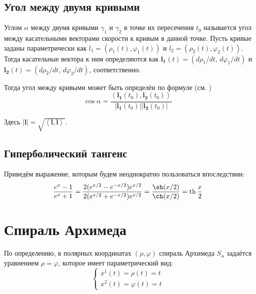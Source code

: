 \documentclass{article}
\numberwithin{equation}{section}
\renewcommand{\phi}{\varphi}
\newcommand{\scalmult}[2]{{\left \langle #1 \right \rangle}_{#2}}
\renewcommand{\vec}{\mathbf}
\renewcommand{\th}{\operatorname{th}}
\providecommand{\abs}[1]{\left \lvert{#1}\right \rvert}
\begin{document}
\subsection{Угол между двумя кривыми}

Углом $\alpha$ между двумя кривыми $\gamma_1$ и $\gamma_2$ в точке их
пересечения $t_0$ называется угол между касательными векторами
скорости к кривым в данной точке. Пусть кривые заданы параметрически
как $l_1 = (\rho_1(t), \phi_1(t))$ и $l_2 = (\rho_2(t), \phi_2(t))$.
Тогда касательные вектора к ним определяются как $\vec{l_1}(t) =
(d\rho_1/dt,\,d\phi_1/dt)$ и $\vec{l_2}(t) =
(d\rho_2/dt,\,d{\phi_2}/dt)$, соответственно.

Тогда угол между
кривыми может быть определён по формуле (см. \cite{dubrovin98})
\begin{equation}\label{eq:curves-angle}
  \cos \alpha = \frac{\scalmult{\vec{l_1}(t_0), \vec{l_2}(t_0)}{}}{\abs{\vec{l_1}(t_0)} \abs{\vec{l_2}(t_0)}}
\end{equation}

Здесь $\abs{\vec{l}} = \sqrt{\scalmult{\vec{l},\vec{l}}{}}$.

\subsection{Гиперболический тангенс}

Приведём выражение, которым будем неоднократно пользоваться впоследствии:
\begin{equation}\label{eq:tanh}
  \frac{e^x-1}{e^x+1} =
  \frac{2(e^{x/2}-e^{-x/2})e^{x/2}}{2(e^{x/2}+e^{-x/2})e^{x/2}}
  = \frac{\sh(x/2)}{\ch(x/2)} = \th{\frac{x}{2}}
\end{equation}

\clearpage

\section{Спираль Архимеда}

По определению, в полярных координатах $(\rho, \phi)$ спираль Архимеда
$S_\alpha$ задаётся уравнением $\rho = \phi$, которое имеет
параметрический вид:
\begin{equation}\label{eq:arch-spiral}
  \begin{cases}
    x^1(t) = \rho(t) = t \\
    x^2(t) = \phi(t) = t
  \end{cases}
\end{equation}
\end{document}
